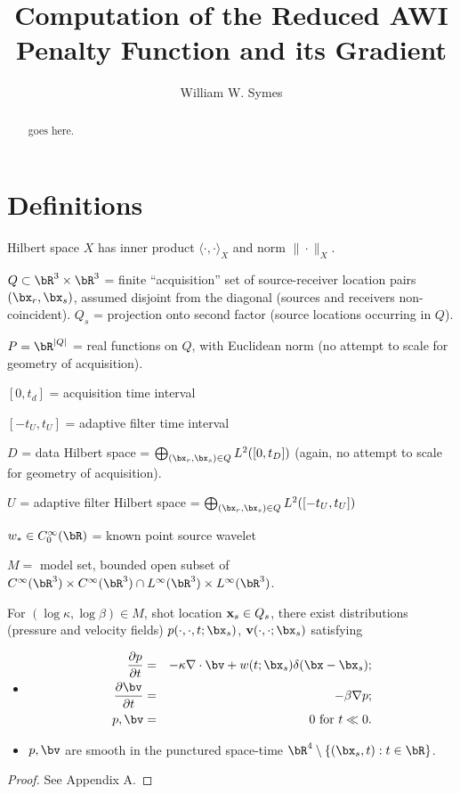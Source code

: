 \title{Computation of the Reduced AWI Penalty Function and its Gradient}
\author{William W. Symes}

\begin{abstract}
goes here.
\end{abstract}

\section{Definitions}
Hilbert space $X$ has inner product $\langle \cdot,\cdot \rangle_X$ and norm $\|\cdot\|_X$.

$Q \subset \bR^3 \times \bR^3$ = finite ``acquisition'' set of source-receiver location pairs $(\bx_r,\bx_s)$, assumed disjoint from the diagonal (sources and receivers non-coincident). $Q_s$ = projection onto second factor (source locations occurring in $Q$).

$P = \bR^{|Q|}$ = real functions on $Q$, with Euclidean norm (no attempt to scale for geometry of acquisition).

$[0,t_d]$ = acquisition time interval

$[-t_U,t_U]$ = adaptive filter time interval

$D$ = data Hilbert space = $\bigoplus_{(\bx_r,\bx_s) \in Q} L^2([0,t_D])$ (again, no attempt to scale for geometry of acquisition).

$U$ = adaptive filter Hilbert space = $\bigoplus_{(\bx_r,\bx_s) \in Q} L^2([-t_U,t_U])$

$w_* \in C_0^{\infty}(\bR)$ = known point source wavelet

$M = $ model set, bounded open subset of $ C^{\infty}(\bR^3) \times C^{\infty}(\bR^3) \cap L^{\infty}(\bR^3) \times L^{\infty}(\bR^3)$.

\begin{theorem}
  \label{thm:eu}
For $(\log \kappa, \log \beta) \in M$, shot location ${\bf x}_s\in Q_s$, there exist distributions (pressure and velocity fields) $p(\cdot,\cdot,t;\bx_s)$, ${\bf v}(\cdot,\cdot;\bx_s)$ satisfying
\begin{itemize}
\item
  \begin{eqnarray}
    \label{eqn:awe}
    \frac{\partial p}{\partial t} & = & - \kappa \nabla \cdot \bv +
                                        w(t;\bx_s) \delta(\bx-\bx_s); \\
    \frac{\partial \bv}{\partial t} & = & - \beta \nabla p; \\
    p, \bv & = & 0 \mbox{ for }  t \ll 0.
  \end{eqnarray}
\item
  $p, \bv$ are smooth in the punctured space-time $\bR^4 \setminus \{(\bx_s,t): t \in \bR\}$.
\end{itemize}
\end{theorem}
\begin{proof}
  See Appendix A.
\end{proof}

